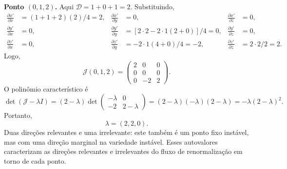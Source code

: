 \documentclass[12pt,a4paper]{article}
\newcommand{\pd}[2]{\frac{\partial #1}{\partial #2}}
\begin{document}
\noindent\textbf{Ponto \((0,1,2)\).}
%
Aqui \(\mathcal D=1+0+1=2\). Substituindo,
%
\begin{align}
    \pd{x'}{x} &= (1+1+2)(2)/4 = 2, &
    \pd{x'}{y} &= 0, &
    \pd{x'}{z} &= 0,
    \\
    \pd{y'}{x} &= 0, &
    \pd{y'}{y} &= [2\cdot2-2\cdot1(2+0)]/4 = 0, &
    \pd{y'}{z} &= 0,
    \\
    \pd{z'}{x} &= 0, &
    \pd{z'}{y} &= -2\cdot1(4+0)/4 = -2, &
    \pd{z'}{z} &= 2\cdot2/2 = 2.
\end{align}
%
Logo,
%
\begin{equation}
    \mathcal J(0,1,2)
    =
    \begin{pmatrix}
        2 & 0 & 0 \\
        0 & 0 & 0 \\
        0 & -2 & 2
    \end{pmatrix}.
\end{equation}
%
O polinômio característico é
%
\begin{equation}
    \det(\mathcal J-\lambda I)
    =
    (2-\lambda)
    \det
    \begin{pmatrix}
        -\lambda & 0 \\
        -2 & 2-\lambda
    \end{pmatrix}
    =
    (2-\lambda)(-\lambda)(2-\lambda)
    =
    -\lambda(2-\lambda)^2.
\end{equation}
%
Portanto,
%
\begin{equation}
    \boxed{
    \lambda=(2,2,0).
    }
\end{equation}
%
Duas direções relevantes e uma irrelevante: este também é um ponto
fixo instável, mas com uma direção marginal na variedade instável. Esses autovalores caracterizam as direções relevantes e irrelevantes do fluxo de renormalização em torno de cada ponto.
%
\end{document}
